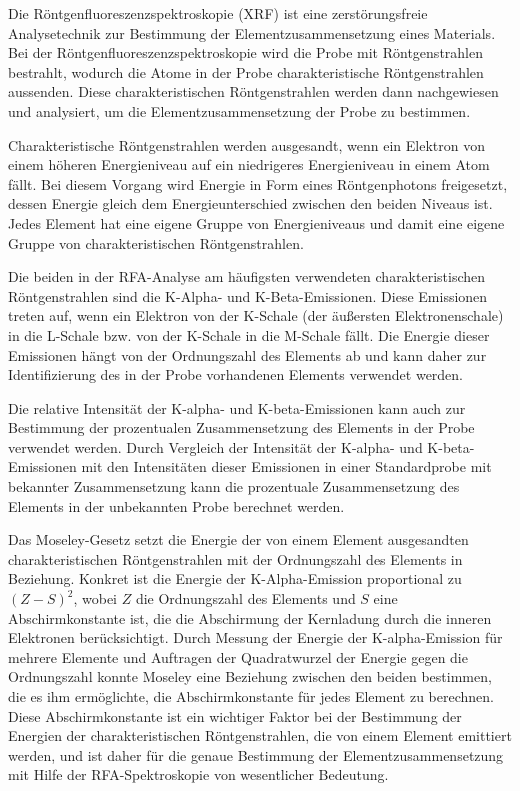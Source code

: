 \documentclass[12pt,english,ngerman]{scrartcl}
\begin{document}
Die Röntgenfluoreszenzspektroskopie (XRF) ist eine zerstörungsfreie
Analysetechnik zur Bestimmung der Elementzusammensetzung eines Materials. Bei
der Röntgenfluoreszenzspektroskopie wird die Probe mit Röntgenstrahlen
bestrahlt, wodurch die Atome in der Probe charakteristische Röntgenstrahlen
aussenden. Diese charakteristischen Röntgenstrahlen werden dann nachgewiesen
und analysiert, um die Elementzusammensetzung der Probe zu bestimmen.

Charakteristische Röntgenstrahlen werden ausgesandt, wenn ein Elektron von
einem höheren Energieniveau auf ein niedrigeres Energieniveau in einem Atom
fällt. Bei diesem Vorgang wird Energie in Form eines Röntgenphotons
freigesetzt, dessen Energie gleich dem Energieunterschied zwischen den beiden
Niveaus ist. Jedes Element hat eine eigene Gruppe von Energieniveaus und damit
eine eigene Gruppe von charakteristischen Röntgenstrahlen.

Die beiden in der RFA-Analyse am häufigsten verwendeten charakteristischen
Röntgenstrahlen sind die K-Alpha- und K-Beta-Emissionen. Diese Emissionen
treten auf, wenn ein Elektron von der K-Schale (der äußersten Elektronenschale)
in die L-Schale bzw. von der K-Schale in die M-Schale fällt. Die Energie dieser
Emissionen hängt von der Ordnungszahl des Elements ab und kann daher zur
Identifizierung des in der Probe vorhandenen Elements verwendet werden.

Die relative Intensität der K-alpha- und K-beta-Emissionen kann auch zur
Bestimmung der prozentualen Zusammensetzung des Elements in der Probe verwendet
werden. Durch Vergleich der Intensität der K-alpha- und K-beta-Emissionen mit
den Intensitäten dieser Emissionen in einer Standardprobe mit bekannter
Zusammensetzung kann die prozentuale Zusammensetzung des Elements in der
unbekannten Probe berechnet werden.

Das Moseley-Gesetz setzt die Energie der von einem Element ausgesandten
charakteristischen Röntgenstrahlen mit der Ordnungszahl des Elements in
Beziehung. Konkret ist die Energie der K-Alpha-Emission proportional zu $(Z -
	S)^2$, wobei $Z$ die Ordnungszahl des Elements und $S$ eine Abschirmkonstante
ist, die die Abschirmung der Kernladung durch die inneren Elektronen
berücksichtigt. Durch Messung der Energie der K-alpha-Emission für mehrere
Elemente und Auftragen der Quadratwurzel der Energie gegen die Ordnungszahl
konnte Moseley eine Beziehung zwischen den beiden bestimmen, die es ihm
ermöglichte, die Abschirmkonstante für jedes Element zu berechnen. Diese
Abschirmkonstante ist ein wichtiger Faktor bei der Bestimmung der Energien der
charakteristischen Röntgenstrahlen, die von einem Element emittiert werden, und
ist daher für die genaue Bestimmung der Elementzusammensetzung mit Hilfe der
RFA-Spektroskopie von wesentlicher Bedeutung.
\end{document}
